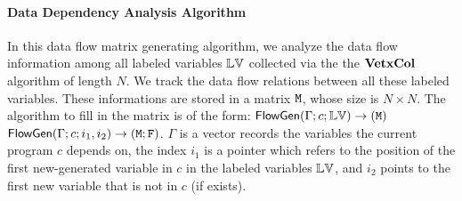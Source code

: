 \paragraph{Data Dependency Analysis Algorithm}
%
In this data flow matrix generating algorithm, we analyze the data flow information among all labeled variables $\mathbb{LV}$ collected via the the $\bf{VetxCol}$ algorithm of length $N$.
%
We track the data flow relations between all these labeled variables. These informations are stored in a matrix $\mathtt{M}$, whose size is $N \times N$. 
%
The algorithm to fill in the matrix is of the form: 
{$\mathsf{FlowGen}{(\Gamma ; {c} ; \mathbb{LV})}\to {(\ensuremath{\mathtt{M}})}$}
$\mathsf{FlowGen}{(\Gamma ; {c} ; i_1, i_2)}\to {(\ensuremath{\mathtt{M}}; \ensuremath{\mathtt{F}})}$. 
$\Gamma$ is a vector records the variables the current program ${c}$ depends on, the index $i_1$ is a pointer which refers to the position of the first new-generated variable in ${c}$ in the labeled variables $\mathbb{LV}$, and $i_2$ points to the first new variable that is not in ${c}$ (if exists). 
%
